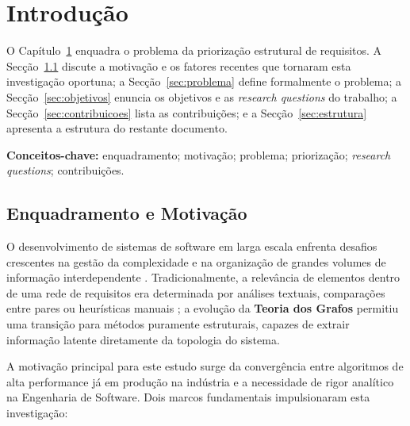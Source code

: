\chapter{Introdução}
\label{ch:introducao}

O Capítulo~\ref{ch:introducao} enquadra o problema da priorização
estrutural de requisitos. A Secção~\ref{sec:motivacao} discute a
motivação e os fatores recentes que tornaram esta investigação
oportuna; a Secção~\ref{sec:problema} define formalmente o problema; a
Secção~\ref{sec:objetivos} enuncia os objetivos e as
\emph{research questions} do trabalho; a Secção~\ref{sec:contribuicoes}
lista as contribuições; e a Secção~\ref{sec:estrutura} apresenta a
estrutura do restante documento.

\noindent\textbf{Conceitos-chave:} enquadramento; motivação; problema;
priorização; \emph{research questions}; contribuições.

\section{Enquadramento e Motivação}
\label{sec:motivacao}

O desenvolvimento de sistemas de software em larga escala enfrenta
desafios crescentes na gestão da complexidade e na organização de
grandes volumes de informação interdependente \parencite{sommerville2007}.
Tradicionalmente, a relevância de elementos dentro de uma rede de
requisitos era determinada por análises textuais, comparações entre
pares ou heurísticas manuais
\parencite{karlsson2007, karlsson1997, berander2005}; a evolução da
\textbf{Teoria dos Grafos} \parencite{newman2010, szwarcfiter2018}
permitiu uma transição para métodos puramente estruturais, capazes de
extrair informação latente diretamente da topologia do sistema.

A motivação principal para este estudo surge da convergência entre
algoritmos de alta performance já em produção na indústria e a
necessidade de rigor analítico na Engenharia de Software. Dois marcos
fundamentais impulsionaram esta investigação:

